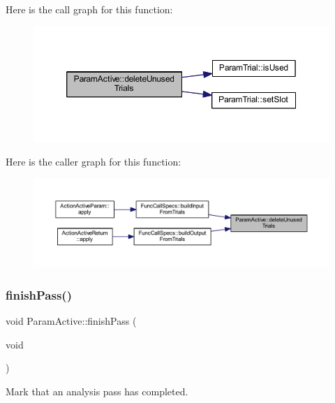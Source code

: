 Here is the call graph for this function\+:
\nopagebreak
\begin{figure}[H]
\begin{center}
\leavevmode
\includegraphics[width=350pt]{class_param_active_a23ffb29ecb4569901e136929a50ac6b2_cgraph}
\end{center}
\end{figure}
Here is the caller graph for this function\+:
\nopagebreak
\begin{figure}[H]
\begin{center}
\leavevmode
\includegraphics[width=350pt]{class_param_active_a23ffb29ecb4569901e136929a50ac6b2_icgraph}
\end{center}
\end{figure}
\mbox{\label{class_param_active_a0cc6c52ae0d0c76d38fb603a10a7b53e}} 
\subsubsection{\texorpdfstring{finishPass()}{finishPass()}}
{\footnotesize\ttfamily void Param\+Active\+::finish\+Pass (\begin{DoxyParamCaption}\item[{void}]{ }\end{DoxyParamCaption})\hspace{0.3cm}{\ttfamily [inline]}}



Mark that an analysis pass has completed. 




